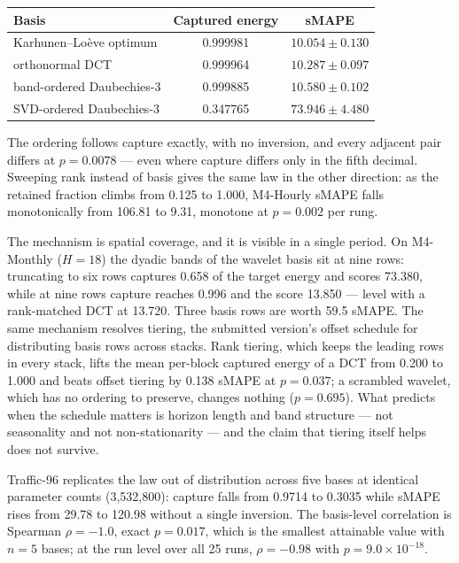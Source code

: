 \begin{center}
\small
\begin{tabular}{lcc}
\toprule
Basis & Captured energy & sMAPE \\
\midrule
Karhunen--Lo\`eve optimum & 0.999981 & $10.054 \pm 0.130$ \\
orthonormal DCT & 0.999964 & $10.287 \pm 0.097$ \\
band-ordered Daubechies-3 & 0.999885 & $10.580 \pm 0.102$ \\
SVD-ordered Daubechies-3 & 0.347765 & $73.946 \pm 4.480$ \\
\bottomrule
\end{tabular}
\end{center}

The ordering follows capture exactly, with no inversion, and every
adjacent pair differs at $p = 0.0078$ --- even where capture differs only
in the fifth decimal. Sweeping rank instead of basis gives the same law in
the other direction: as the retained fraction climbs from 0.125 to 1.000,
M4-Hourly sMAPE falls monotonically from 106.81 to 9.31, monotone at
$p = 0.002$ per rung.

The mechanism is spatial coverage, and it is visible in a single
period. On M4-Monthly ($H = 18$) the dyadic bands of the wavelet basis sit
at nine rows: truncating to six rows captures 0.658 of the target energy
and scores 73.380, while at nine rows capture reaches 0.996 and the score
13.850 --- level with a rank-matched DCT at 13.720. Three basis rows are
worth 59.5 sMAPE. The same mechanism resolves tiering, the submitted
version's offset schedule for distributing basis rows across stacks.
Rank tiering, which keeps the leading rows in every stack, lifts the mean
per-block captured energy of a DCT from 0.200 to 1.000 and beats offset
tiering by 0.138 sMAPE at $p = 0.037$; a scrambled wavelet, which has no
ordering to preserve, changes nothing ($p = 0.695$). What predicts when
the schedule matters is horizon length and band structure --- not
seasonality and not non-stationarity --- and the claim that tiering
itself helps does not survive.

Traffic-96 replicates the law out of distribution across five bases at
identical parameter counts (3{,}532{,}800): capture falls from 0.9714 to
0.3035 while sMAPE rises from 29.78 to 120.98 without a single inversion.
The basis-level correlation is Spearman $\rho = -1.0$, exact
$p = 0.017$, which is the smallest attainable value with $n = 5$ bases;
at the run level over all 25 runs, $\rho = -0.98$ with
$p = 9.0\times10^{-18}$.

